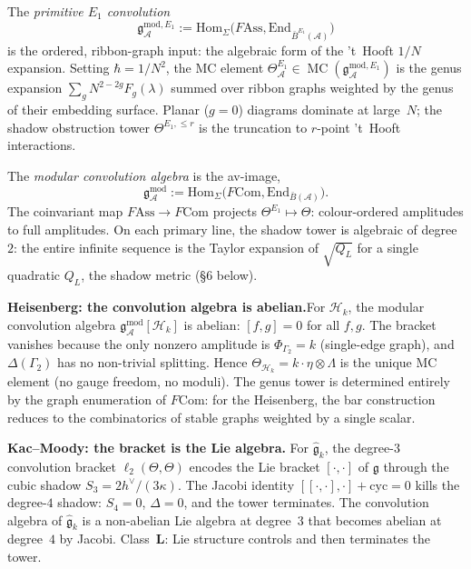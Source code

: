 \documentclass[11pt,reqno]{amsart}
\theoremstyle{definition}
\theoremstyle{remark}
\providecommand{\cA}{\mathcal{A}}
\providecommand{\cH}{\mathcal{H}}
\providecommand{\barB}{\bar{B}}
\providecommand{\Hom}{\mathrm{Hom}}
\providecommand{\fg}{\mathfrak{g}}
\providecommand{\gAmod}{\mathfrak{g}^{\mathrm{mod}}_\cA}
\providecommand{\Ass}{\mathrm{Ass}}
\providecommand{\Com}{\mathrm{Com}}
\providecommand{\End}{\mathrm{End}}
\numberwithin{equation}{section}
\begin{document}
The \emph{primitive $E_1$ convolution}
\[
\mathfrak g^{\mathrm{mod},E_1}_\cA:=\Hom_\Sigma\bigl(F\!\Ass,\End_{\barB^{E_1}(\cA)}\bigr)
\]
is the ordered, ribbon-graph input: the algebraic form of the 't~Hooft
$1/N$ expansion. Setting $\hbar=1/N^2$, the MC element
$\Theta^{E_1}_\cA\in\operatorname{MC}(\mathfrak g^{\mathrm{mod},E_1}_\cA)$
is the genus expansion $\sum_g N^{2-2g}F_g(\lambda)$ summed over
ribbon graphs weighted by the genus of their embedding surface.
Planar ($g=0$) diagrams dominate at large~$N$; the shadow obstruction
tower $\Theta^{E_1,\le r}$ is the truncation to $r$-point 't~Hooft
interactions.

The \emph{modular convolution algebra} is the av-image,
\begin{equation}\label{eq:preface-gmod}
\gAmod:=\Hom_\Sigma\bigl(F\Com,\End_{\barB(\cA)}\bigr).
\end{equation}
The coinvariant map $F\!\Ass\to F\Com$ projects
$\Theta^{E_1}\mapsto\Theta$: colour-ordered amplitudes to full
amplitudes. On each primary line, the shadow tower is algebraic of
degree~$2$: the entire infinite sequence is the Taylor expansion of
$\sqrt{Q_L}$ for a single quadratic $Q_L$, the shadow metric
(\S6 below).

\medskip
\noindent\textbf{Heisenberg: the convolution algebra is
abelian.}\enspace For $\cH_k$, the modular convolution algebra
$\gAmod[\cH_k]$ is abelian: $[f,g] = 0$ for all $f,g$. The
bracket vanishes because the only nonzero amplitude is
$\Phi_{\Gamma_2} = k$ (single-edge graph), and
$\Delta(\Gamma_2)$ has no non-trivial splitting. Hence
$\Theta_{\cH_k} = k \cdot \eta \otimes \Lambda$ is the unique
MC element (no gauge freedom, no moduli). The genus tower is
determined entirely by the graph enumeration of $F\Com$: for
the Heisenberg, the bar construction reduces to the
combinatorics of stable graphs weighted by a single scalar.

\noindent\textbf{Kac--Moody: the bracket is the Lie algebra.}\enspace
For $\widehat{\fg}_k$, the degree-$3$ convolution bracket
$\ell_2(\Theta, \Theta)$ encodes the Lie bracket $[\cdot,\cdot]$
of $\fg$ through the cubic shadow $S_3 = 2h^\vee/(3\kappa)$.
The Jacobi identity $[[\cdot,\cdot],\cdot] + \text{cyc} = 0$
kills the degree-$4$ shadow: $S_4 = 0$, $\Delta = 0$, and the
tower terminates. The convolution algebra of $\widehat{\fg}_k$
is a non-abelian Lie algebra at degree~$3$ that becomes abelian
at degree~$4$ by Jacobi. Class~$\mathbf{L}$: Lie structure
controls and then terminates the tower.
\end{document}
